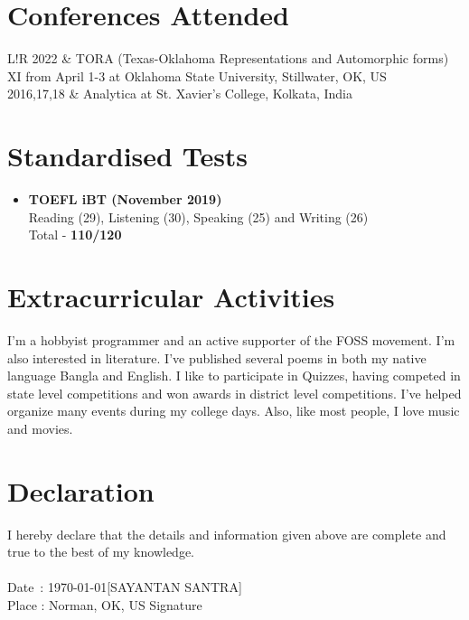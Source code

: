 \documentclass{article}
\newcommand\VRule{\color{lightgray}\vrule width 0.5pt}
\begin{document}
\section*{Conferences Attended}
\begin{tabular}{L!{\VRule}R}
	2022       & TORA (Texas-Oklahoma Representations and Automorphic forms) XI from April 1-3 at Oklahoma State University, Stillwater, OK, US \\
	2016,17,18 & Analytica at St. Xavier's College, Kolkata, India
\end{tabular}

\section*{Standardised Tests}
\begin{itemize}
	\item {\bf TOEFL iBT (November 2019)} \\
	      Reading (29), Listening (30), Speaking (25) and Writing (26) \\
	      Total - {\bf 110/120}
\end{itemize}

\section*{Extracurricular Activities}
I'm a hobbyist programmer and an active supporter of the FOSS movement. I'm also interested in literature. I've published several poems in both my native language Bangla and English. I like to participate in Quizzes, having competed in state level competitions and won awards in district level competitions. I've helped organize many events during my college days. Also, like most people, I love music and movies.

\section*{Declaration}
I hereby declare that the details and information given above are complete and true to the best of my knowledge. \\
\vspace{2cm} \\
Date \,: \today \hfill [SAYANTAN SANTRA] \\
Place  : Norman, OK, US \hfill Signature \hspace{1cm} \\
\end{document}
